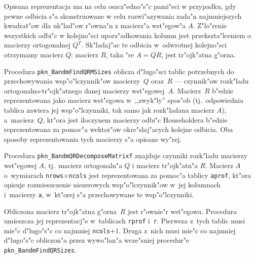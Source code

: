 Opisana reprezentacja ma na celu oszcz"edno"s"c pami"eci w przypadku, gdy
pewne odbicia s"a skonstruowane w celu rozwi"azywania zada"n najmniejszych
kwadrat"ow dla uk"lad"ow r"owna"n z macierz"a wst"egow"a $A$. Z"lo"renie
wszystkich odbi"c w kolejno"sci uporz"adkowania kolumn jest
przekszta"lceniem o macierzy ortogonalnej $Q^T$. Sk"la\-daj"ac te odbicia
w~odwrotnej kolejno"sci otrzymamy macierz $Q$: macierz $R$, taka "re $A=QR$,
jest tr"ojk"atna g"orna.

\vspace{\bigskipamount}
\begin{sloppypar}
Procedura \texttt{pkn\_BandmFindQRMSizes} oblicza d"lugo"sci tablic
potrzebnych do przechowywania wsp"o"lczynnik"ow macierzy~$Q$ oraz~$R$ ---
czynnik"ow rozk"ladu ortogonalno-tr"ojk"atnego danej macierzy wst"egowej~$A$.
Macierz~$R$ b"edzie reprezentowana jako macierz wst"egowa w~,,zwyk\-"ly''
spos"ob (tj.\ odpowiednia tablica zawiera jej wsp"o"lczynniki, tak samo jak
rozk"ladana macierz $A$), a~macierz~$Q$,
kt"ora jest iloczynem macierzy odbi"c Householdera b"edzie reprezentowana
za pomoc"a wektor"ow okre"slaj"acych kolejne odbicia. Oba sposoby
reprezentowania tych macierzy s"a opisane wy"rej.
\end{sloppypar}

\vspace{\bigskipamount}
Procedura \texttt{pkn\_BandmQRDecomposeMatrixf} znajduje czynniki rozk"ladu
macierzy wst"egowej $A$, tj.\ macierz ortogonaln"a $Q$ i macierz
tr"ojk"atn"a $R$. Macierz $A$ o~wymiarach
\texttt{nrows}$\times$\texttt{ncols} jest reprezentowana za pomoc"a tablicy
\texttt{aprof}, kt"ora opisuje rozmieszczenie niezerowych wsp"o"lczynnik"ow
w~jej kolumnach i~macierzy \texttt{a}, w~kt"orej s"a przechowywane te
wsp"o"lczynniki.

Obliczona macierz tr"ojk"atna g"orna~$R$ jest r"ownie"r wst"egowa.
Procedura umieszcza jej reprezentacj"e w~tablicach \texttt{rprof}
i~\texttt{r}. Pierwsza z~tych tablic musi mie"c d"lugo"s"c co najmniej
\texttt{ncols}$+1$. Druga z~nich musi mie"c co najmniej d"lugo"s"c
obliczon"a przez wywo"lan"a wcze"sniej procedur"e
\texttt{pkn\_BandmFindQRSizes}.

